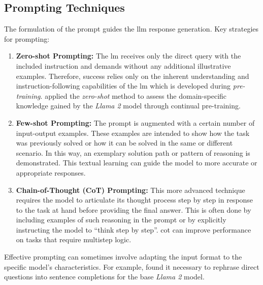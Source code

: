 \subsection{Prompting Techniques}
%
The formulation of the prompt guides the \ac{llm} response generation.
Key strategies for prompting:
\begin{enumerate}
    \item \textbf{Zero-shot Prompting:}\label{item:zero_shot} 
    The \ac{lm} receives only the direct query with the included instruction and demands without any additional illustrative examples.
    Therefore, success relies only on the inherent understanding and instruction-following capabilities of the \ac{lm} which is developed during \textit{pre-training}.
    \citet{Paul_Keller} applied the \textit{zero-shot} method to assess the domain-specific knowledge gained by the \textit{Llama 2} model through continual pre-training.
    \item \textbf{Few-shot Prompting:}\label{item:few_shot} 
    The prompt is augmented with a certain number of input-output examples.
    These examples are intended to show how the task was previously solved or how it can be solved in the same or different scenario.
    In this way, an exemplary solution path or pattern of reasoning is demonstrated.
    This textual learning can guide the model to more accurate or appropriate responses.
    \item \textbf{Chain-of-Thought (CoT) Prompting:}\label{item:cot} This more advanced technique requires the model to articulate its thought process step by step in response to the task at hand before providing the final answer.
    This is often done by including examples of such reasoning in the prompt or by explicitly instructing the model to \enquote{think step by step}.
    \ac{cot} can improve performance on tasks that require multistep logic.
\end{enumerate}
Effective prompting can sometimes involve adapting the input format to the specific model's characteristics. 
For example, \citet{Paul_Keller} found it necessary to rephrase direct questions into sentence completions for the base \textit{Llama 2} model.
%
